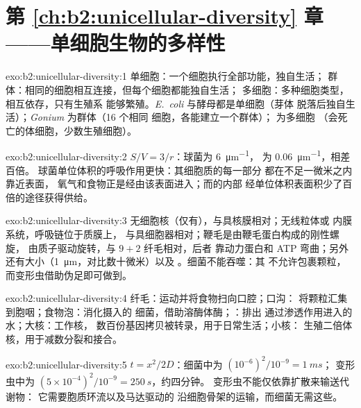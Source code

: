 \section*{第 \ref{ch:b2:unicellular-diversity} 章——单细胞生物的多样性}

\begin{solution}{exo:b2:unicellular-diversity:1}
单细胞：一个细胞执行全部功能，独自生活；
群体：相同的细胞相互连接，但每个细胞都能独自生活；
多细胞：多种细胞类型，相互依存，只有生殖系
能够繁殖。\emph{E.~coli} 与酵母都是单细胞（芽体
脱落后独自生活）；\emph{Gonium} 为群体（16 个相同
细胞，各能建立一个群体）； 为多细胞
（会死亡的体细胞，少数生殖细胞）。
\end{solution}

\begin{solution}{exo:b2:unicellular-diversity:2}
$S/V = 3/r$：球菌为 \qty{6}{\micro m^{-1}}，
为 \qty{0.06}{\micro m^{-1}}，相差百倍。
球菌单位体积的呼吸作用更快：其细胞质的每一部分
都在不足一微米之内靠近表面，
氧气和食物正是经由该表面进入；而的内部
经单位体积表面积少了百倍的途径获得供给。
\end{solution}

\begin{solution}{exo:b2:unicellular-diversity:3}
无细胞核（仅有），与具核膜相对；无线粒体或
内膜系统，呼吸链位于质膜上，
与具细胞器相对；鞭毛是由鞭毛蛋白构成的刚性螺旋，
由质子驱动旋转，与 $9+2$ 纤毛相对，后者
靠动力蛋白和 ATP 弯曲；另外还有大小（\qty{1}{\micro m}，对比数十微米）以及
。细菌不能吞噬：其
不允许包裹颗粒，而变形虫借助伪足即可做到。
\end{solution}

\begin{solution}{exo:b2:unicellular-diversity:4}
纤毛：运动并将食物扫向口腔；口沟：
将颗粒汇集到胞咽；食物泡：消化摄入的
细菌，借助溶酶体酶；：排出
通过渗透作用进入的水；大核：工作核，
数百份基因拷贝被转录，用于日常生活；小核：
生殖二倍体核，用于减数分裂和接合。
\end{solution}

\begin{solution}{exo:b2:unicellular-diversity:5}
$t = x^2/2D$：细菌中为 $(10^{-6})^2/10^{-9} = \qty{1}{ms}$；
变形虫中为 $(5\times 10^{-4})^2/10^{-9} = \qty{250}{s}$，约四分钟。
变形虫不能仅依靠扩散来输送代谢物：
它需要胞质环流以及马达驱动的
沿细胞骨架的运输，而细菌无需这些。
\end{solution}

